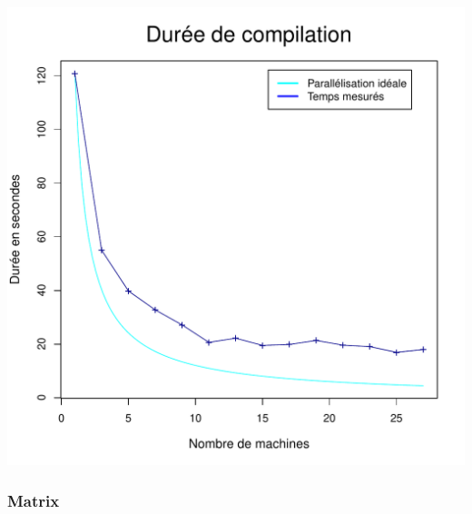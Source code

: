 \documentclass[a4paper, 11pt, titlepage]{article}
\begin{document}
\begin{center}
    \includegraphics[scale=0.45]{res/sujet_makefiles_blender_259_Makefile_nth1.pdf}
\end{center}



\subsubsection {Matrix}
\end{document}
